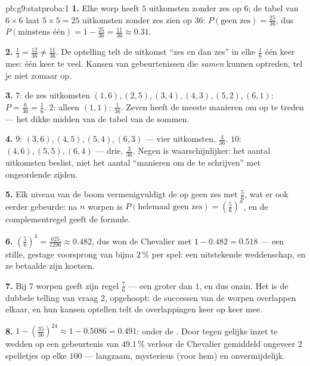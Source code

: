 \begin{solution}{pb:g9:statproba:1}
\textbf{1.} Elke worp heeft $5$ uitkomsten zonder zes op $6$; de tabel van
$6 \times 6$ laat $5 \times 5 = 25$ uitkomsten zonder zes zien op $36$:
$P(\text{geen zes}) = \frac{25}{36}$, dus
$P(\text{minstens één}) = 1 - \frac{25}{36} = \frac{11}{36} \approx 0.31$.

\textbf{2.} $\frac13 = \frac{12}{36} \neq \frac{11}{36}$. De optelling telt de
uitkomst ``zes en dan zes'' in elke $\frac16$ één keer mee: één keer te veel.
Kansen van gebeurtenissen die \emph{samen} kunnen optreden, tel je niet zomaar
op.

\textbf{3.}  $7$: de zes uitkomsten $(1,6), (2,5), (3,4), (4,3), (5,2),
(6,1)$: $P = \frac{6}{36} = \frac16$.  $2$: alleen $(1,1)$: $\frac{1}{36}$.
Zeven heeft de meeste manieren om op te treden --- het dikke midden van de tabel
van de sommen.

\textbf{4.}  $9$: $(3,6), (4,5), (5,4), (6,3)$ --- vier uitkomsten,
$\frac{4}{36}$.  $10$: $(4,6), (5,5), (6,4)$ --- drie, $\frac{3}{36}$. Negen is
waarschijnlijker: het aantal uitkomsten beslist, niet het aantal ``manieren om de
 te schrijven'' met ongeordende zijden.

\textbf{5.} Elk niveau van de boom vermenigvuldigt de  op geen zes met
$\frac56$, wat er ook eerder gebeurde: na $n$ worpen is
$P(\text{helemaal geen zes}) = \left(\frac56\right)^n$, en de complementregel geeft
de formule.

\textbf{6.} $\left(\frac56\right)^4 = \frac{625}{1296} \approx 0.482$, dus won de
Chevalier met  $1 - 0.482 = 0.518$ --- een stille, gestage voorsprong van bijna
$2\,\%$ per spel: een uitstekende weddenschap, en ze betaalde zijn koetsen.

\textbf{7.} Bij $7$ worpen geeft zijn regel $\frac76$ --- een  groter dan $1$,
en dus onzin. Het is de dubbele telling van vraag 2, opgehoopt: de successen van de
worpen overlappen elkaar, en hun kansen optellen telt de overlappingen keer op keer
mee.

\textbf{8.} $1 - \left(\frac{35}{36}\right)^{24} \approx 1 - 0.5086 = 0.491$: onder
de . Door tegen gelijke inzet te wedden op een gebeurtenis van $49.1\,\%$
verloor de Chevalier gemiddeld ongeveer $2$ spelletjes op elke $100$ --- langzaam,
mysterieus (voor hem) en onvermijdelijk.


\end{solution}
